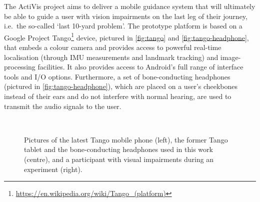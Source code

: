\documentclass{llncs}
\begin{document}
The ActiVis project aims to deliver a mobile guidance system that will ultimately be able to guide a user with vision impairments on the last leg of their journey, i.e.\ the so-called `last 10-yard problem'. 
The prototype platform is based on a Google Project Tango\footnote{\url{https://en.wikipedia.org/wiki/Tango\_(platform)}} device, pictured in \cref{fig:tango} and \cref{fig:tango-headphone}, that embeds a colour camera and provides access to powerful real-time localisation (through IMU measurements and landmark tracking) and image-processing facilities. 
It also provides access to Android's full range of interface tools and I/O options. 
Furthermore, a set of bone-conducting headphones (pictured in \cref{fig:tango-headphone}), which are placed on a user's cheekbones instead of their ears and do not interfere with normal hearing, are used to transmit the audio signals to the user.

\begin{figure}[t]
  \centering
~
~
  \caption{Pictures of the latest Tango mobile phone (left), the former Tango tablet and the bone-conducting headphones used in this work (centre), and a participant with visual impairments during an experiment (right).}
\end{figure}
\end{document}
